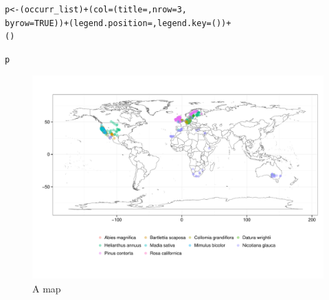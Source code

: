 \begin{knitrout}
\begin{kframe}
\begin{alltt}
p <- (occurr_list) + (col = (title = , nrow = 3, 
    byrow = TRUE)) + (legend.position = , legend.key = ()) + 
    ()
\end{alltt}


{\ttfamily\noindent\itshape\color{messagecolor}{\#\# Rendering map...plotting 623 points}}\begin{alltt}
p
\end{alltt}
\end{kframe}\begin{figure}[h]

\includegraphics[width=.9\textwidth]{figure/plot_map} \caption[A map]{A map\label{fig:mapplot_map}}
\end{figure}


\end{knitrout}

